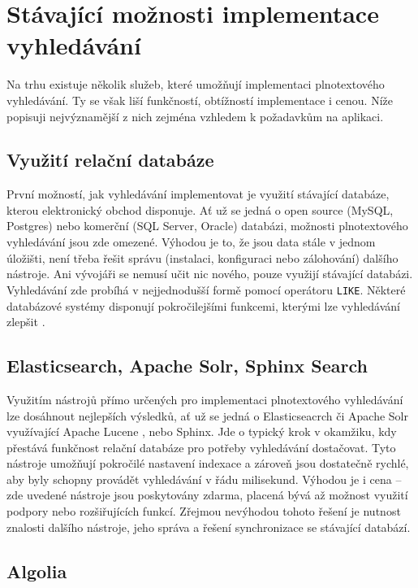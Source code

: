 \documentclass[FM,DP]{tulthesis}
\begin{document}
\section{Stávající možnosti implementace vyhledávání}

Na trhu existuje několik služeb, které umožňují implementaci plnotextového vyhledávání.
Ty se však liší funkčností, obtížností implementace i cenou. Níže popisuji nejvýznamější 
z nich zejména vzhledem k požadavkům na aplikaci.

\subsection{Využití relační databáze}

První možností, jak vyhledávání implementovat je využití stávající databáze, 
kterou elektronický obchod disponuje. Ať už se jedná o open source (MySQL, Postgres)
nebo komerční (SQL Server, Oracle) databázi, možnosti plnotextového vyhledávání
jsou zde omezené. Výhodou je to, že jsou data stále v jednom úložišti, není třeba
řešit správu (instalaci, konfiguraci nebo zálohování) dalšího nástroje. Ani vývojáři 
se nemusí učit nic nového, pouze využijí stávající databázi. Vyhledávání zde probíhá
v nejjednodušší formě pomocí operátoru \verb|LIKE|. Některé databázové systémy
disponují pokročilejšími funkcemi, kterými lze vyhledávání zlepšit \cite{postgres}.

\subsection{Elasticsearch, Apache Solr, Sphinx Search}

Využitím nástrojů přímo určených pro implementaci plnotextového vyhledávání lze 
dosáhnout nejlepších výsledků, ať už se jedná o Elasticseacrch či Apache Solr využívající
Apache Lucene \cite{lucene}, nebo Sphinx. Jde o typický krok v okamžiku, kdy
přestává funkčnost relační databáze pro potřeby vyhledávání dostačovat. Tyto nástroje
umožňují pokročilé nastavení indexace a zároveň jsou dostatečně rychlé, aby byly
schopny provádět vyhledávání v řádu milisekund. Výhodou je i cena -- zde uvedené nástroje
jsou poskytovány zdarma, placená bývá až možnost využití podpory nebo rozšiřujících funkcí.
Zřejmou nevýhodou tohoto řešení je nutnost znalosti dalšího nástroje, jeho správa a řešení 
synchronizace se stávající databází.

\subsection{Algolia}
\end{document}

